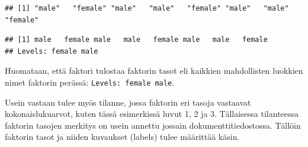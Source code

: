 \documentclass[
]{book}
\newenvironment{Shaded}{\begin{snugshade}}{\end{snugshade}}
\newcommand{\CommentTok}[1]{\textcolor[rgb]{0.56,0.35,0.01}{\textit{#1}}}
\newcommand{\FunctionTok}[1]{\textcolor[rgb]{0.00,0.00,0.00}{#1}}
\newcommand{\NormalTok}[1]{#1}
\newcommand{\OtherTok}[1]{\textcolor[rgb]{0.56,0.35,0.01}{#1}}
\newcommand{\SpecialCharTok}[1]{\textcolor[rgb]{0.00,0.00,0.00}{#1}}
\begin{document}
\begin{Shaded}
\end{Shaded}

\begin{verbatim}
## [1] "male"   "female" "male"   "male"   "female" "male"   "male"   "female"
\end{verbatim}

\begin{Shaded}
\end{Shaded}

\begin{verbatim}
## [1] male   female male   male   female male   male   female
## Levels: female male
\end{verbatim}

Huomataan, että faktori tulostaa faktorin tasot eli kaikkien mahdollisten luokkien nimet faktorin perässä: \texttt{Levels:\ female\ male}.

Usein vastaan tulee myös tilanne, jossa faktorin eri tasoja vastaavat kokonaislukuarvot, kuten tässä esimerkissä luvut 1, 2 ja 3. Tällaisessa tilanteessa faktorin tasojen merkitys on usein annettu jossain dokumenttitiedostossa. Tällöin faktorin tasot ja niiden kuvaukset (labels) tulee määrittää käsin.
\end{document}
